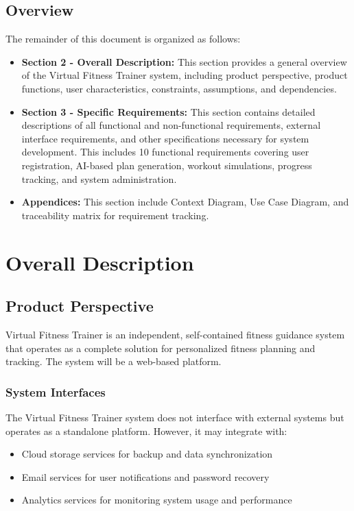 \documentclass[12pt,a4paper]{article}
\begin{document}
\subsection{Overview}
The remainder of this document is organized as follows:

\begin{itemize}
    \item \textbf{Section 2 - Overall Description:} This section provides a general overview of the Virtual Fitness Trainer system, including product perspective, product functions, user characteristics, constraints, assumptions, and dependencies.
    
    \item \textbf{Section 3 - Specific Requirements:} This section contains detailed descriptions of all functional and non-functional requirements, external interface requirements, and other specifications necessary for system development. This includes 10 functional requirements covering user registration, AI-based plan generation, workout simulations, progress tracking, and system administration.
    
    \item \textbf{Appendices:} This section include Context Diagram, Use Case Diagram, and traceability matrix for requirement tracking.
\end{itemize}

\newpage

\section{Overall Description}

\subsection{Product Perspective}
Virtual Fitness Trainer is an independent, self-contained fitness guidance system that operates as a complete solution for personalized fitness planning and tracking. The system will be a web-based platform.

\subsubsection{System Interfaces}
The Virtual Fitness Trainer system does not interface with external systems but operates as a standalone platform. However, it may integrate with:
\begin{itemize}
    \item Cloud storage services for backup and data synchronization
    \item Email services for user notifications and password recovery
    \item Analytics services for monitoring system usage and performance
\end{itemize}
\end{document}
